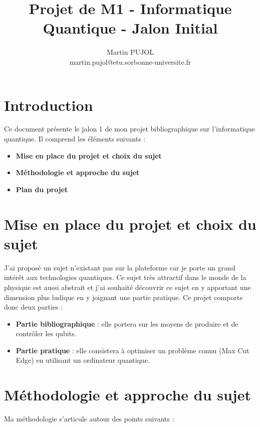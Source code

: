 \documentclass[12pt]{article}
\begin{document}
\title{Projet de M1 - Informatique Quantique - Jalon Initial}
\author{Martin PUJOL \\ martin.pujol@etu.sorbonne-universite.fr}
\date{}

\maketitle

\section*{Introduction}

Ce document présente le jalon 1 de mon projet bibliographique sur l'informatique quantique. Il comprend les éléments suivants :

\begin{itemize}
    \item \textbf{Mise en place du projet et choix du sujet}
    \item \textbf{Méthodologie et approche du sujet}
    \item \textbf{Plan du projet}
\end{itemize}

\section{Mise en place du projet et choix du sujet}

J'ai proposé un sujet n'existant pas sur la plateforme car je porte un grand intérêt aux technologies quantiques. Ce sujet très attractif dans le monde de la physique est aussi abstrait et j'ai souhaité découvrir ce sujet en y apportant une dimension plus ludique en y joignant une partie pratique. Ce projet comporte donc deux parties :

\begin{itemize}
    \item \textbf{Partie bibliographique} : elle portera sur les moyens de produire et de contrôler les qubits.
    \item \textbf{Partie pratique} : elle consistera à optimiser un problème connu (Max Cut Edge) en utilisant un ordinateur quantique.
\end{itemize}

\section{Méthodologie et approche du sujet}

Ma méthodologie s'articule autour des points suivants :
\end{document}
